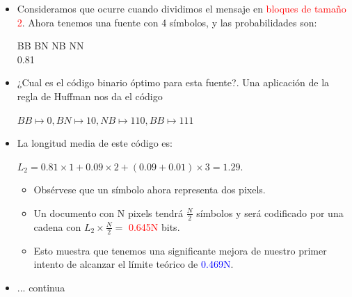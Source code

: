 \documentclass{beamer}
\theoremstyle{plain}
\theoremstyle{example}
\theoremstyle{example}
\begin{document}
\begin{frame}  \footnotesize 

\begin{itemize}

\item Consideramos que ocurre cuando dividimos el mensaje en \textcolor{red}{bloques de tamaño 2}. Ahora tenemos una fuente con 4 símbolos, y las probabilidades son:
\begin{center} BB \;\; BN \;\; NB \;\;\; NN\\
0.81   \end{center}

\item ¿Cual es el código binario óptimo para esta fuente?. Una aplicación de la regla de Huffman nos da el código
\begin{center}$BB \mapsto 0, BN \mapsto 10,NB \mapsto 110, BB \mapsto 111$\end{center}

\item  La longitud media de este código es:
\begin{center} $L_2 =0.81\times 1+0.09 \times 2+(0.09+0.01)\times 3=1.29.$\end{center}

\begin{itemize}\footnotesize
\item Obsérvese que un símbolo ahora representa dos pixels. 
\item Un documento con N pixels tendrá $\frac{N}{2}$ símbolos y será codificado por una cadena con $L_2 \times \frac{N}{2} =$ \textcolor{red}{0.645N} bits.  
\item Esto muestra que tenemos una significante mejora de nuestro primer intento de alcanzar el límite teórico de \textcolor{blue}{0.469N}.
\end{itemize}
\item ... continua 
\end{itemize}

\end{frame} 
\end{document}
